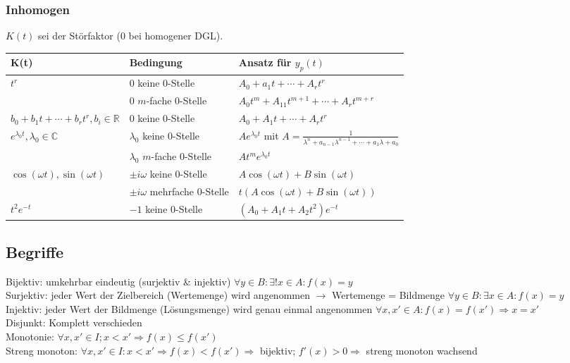         \subsubsection{Inhomogen}
            $K(t)$ sei der Störfaktor (0 bei homogener DGL).
            \begin{tabular}{|p{2cm}|p{2.5cm}|p{3.6cm}|}
                \hline
                K(t) & Bedingung & Ansatz für $y_p(t)$ \\
                \hline
                \multirow{2}{*}{$t^r$} & 0 keine 0-Stelle & $A_0+a_1t+\dotsb+A_rt^r$ \\ \cline{2-3}
                & 0 $m$-fache 0-Stelle & $A_0t^m+A_11t^{m+1}+\dotsb+A_rt^{m+r}$ \\
                \hline
                $b_0+b_1t+\dotsb+b_rt^r, b_i\in\mathbb{R}$ & 0 keine 0-Stelle & $A_0+A_1t+\dotsb+A_rt^r$ \\
                \hline
                \multirow{2}{*}{$e^{\lambda_0 t}, \lambda_0 \in \mathbb{C}$} & $\lambda_0$ keine 0-Stelle & $Ae^{\lambda_0 t}$ mit $A=\frac{1}{\lambda^n+a_{n-1}\lambda^{n-1}+\dotsb+a_1\lambda+a_0}$ \\ \cline{2-3}
                & $\lambda_0$ $m$-fache 0-Stelle & $At^me^{\lambda_0t}$ \\
                \hline
                \multirow{2}{*}{$\cos(\omega t), \sin(\omega t)$} & $\pm i\omega$ keine 0-Stelle & $A\cos(\omega t) + B\sin(\omega t)$ \\ \cline{2-3}
                & $\pm i\omega$ mehrfache 0-Stelle & $t(A\cos(\omega t)+B\sin(\omega t))$ \\
                \hline
                $t^2e^{-t}$ & $-1$ keine 0-Stelle & $(A_0+A_1t + A_2t^2)e^{-t}$ \\
                \hline
            \end{tabular}
    \subsection{Begriffe}
        Bijektiv: umkehrbar eindeutig (surjektiv \& injektiv) $\forall y \in B:\exists! x \in A: f(x) = y$\\
        Surjektiv: jeder Wert der Zielbereich (Wertemenge) wird angenommen $\rightarrow$ Wertemenge = Bildmenge $\forall y \in B: \exists x \in A: f(x) = y$\\
        Injektiv: jeder Wert der Bildmenge (Lösungsmenge) wird genau einmal angenommen $\forall x, x' \in A: f(x) = f(x') \Rightarrow x = x'$\\
        Disjunkt: Komplett verschieden \\
        Monotonie: $\forall x, x' \in I; x < x' \Rightarrow f(x) \leqslant f(x')$ \\
        Streng monoton: $\forall x, x' \in I: x < x' \Rightarrow f(x) < f(x')\Rightarrow$ bijektiv;  $f'(x) > 0\Rightarrow$ streng monoton wachsend
